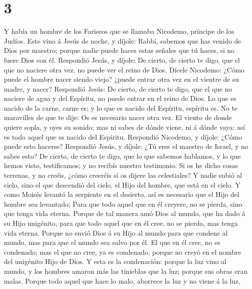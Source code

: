 \hypertarget{section-2}{%
\section{3}\label{section-2}}

 Y había un hombre de los Fariseos que se llamaba Nicodemo,
príncipe de los Judíos.  Este vino á Jesús de noche, y
díjole: Rabbí, sabemos que has venido de Dios por maestro; porque nadie
puede hacer estas señales que tú haces, si no fuere Dios con él.
 Respondió Jesús, y díjole: De cierto, de cierto te digo,
que el que no naciere otra vez, no puede ver el reino de Dios.
 Dícele Nicodemo: ¿Cómo puede el hombre nacer siendo viejo?
¿puede entrar otra vez en el vientre de su madre, y nacer? 
Respondió Jesús: De cierto, de cierto te digo, que el que no naciere de
agua y del Espíritu, no puede entrar en el reino de Dios. 
Lo que es nacido de la carne, carne es; y lo que es nacido del Espíritu,
espíritu es.  No te maravilles de que te dije: Os es
necesario nacer otra vez.  El viento de donde quiere sopla,
y oyes su sonido; mas ni sabes de dónde viene, ni á dónde vaya: así es
todo aquel que es nacido del Espíritu.  Respondió Nicodemo,
y díjole: ¿Cómo puede esto hacerse?  Respondió Jesús, y
díjole: ¿Tú eres el maestro de Israel, y no sabes esto?  De
cierto, de cierto te digo, que lo que sabemos hablamos, y lo que hemos
visto, testificamos; y no recibís nuestro testimonio.  Si
os he dicho cosas terrenas, y no creéis, ¿cómo creeréis si os dijere las
celestiales?  Y nadie subió al cielo, sino el que descendió
del cielo, el Hijo del hombre, que está en el cielo.  Y
como Moisés levantó la serpiente en el desierto, así es necesario que el
Hijo del hombre sea levantado;  Para que todo aquel que en
él creyere, no se pierda, sino que tenga vida eterna. 
Porque de tal manera amó Dios al mundo, que ha dado á su Hijo unigénito,
para que todo aquel que en él cree, no se pierda, mas tenga vida eterna.
 Porque no envió Dios á su Hijo al mundo para que condene
al mundo, mas para que el mundo sea salvo por él.  El que
en él cree, no es condenado; mas el que no cree, ya es condenado, porque
no creyó en el nombre del unigénito Hijo de Dios.  Y esta
es la condenación: porque la luz vino al mundo, y los hombres amaron más
las tinieblas que la luz; porque sus obras eran malas. 
Porque todo aquel que hace lo malo, aborrece la luz y no viene á la luz,
